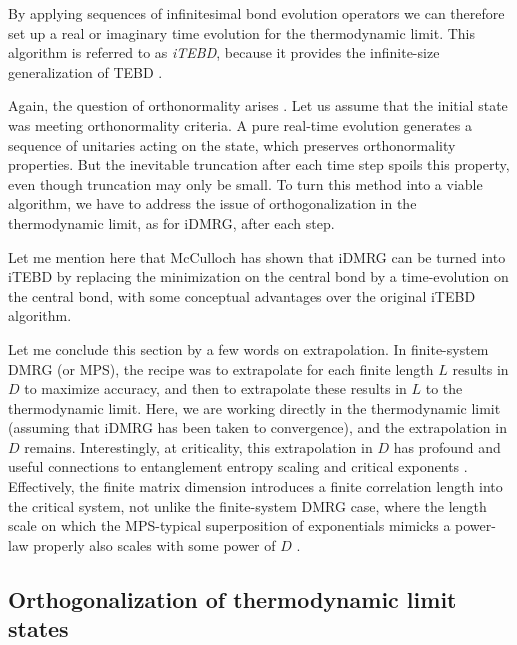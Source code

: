 \documentclass[a4paper,10pt,oneside,onecolumn,1p,times]{elsarticle}
\begin{document}
By applying sequences of infinitesimal bond evolution operators we can therefore set up a real or imaginary time evolution for the thermodynamic limit. This algorithm is referred to as {\em iTEBD}, because it provides the infinite-size generalization of TEBD \cite{Vidal07}.

Again, the question of orthonormality arises \cite{Orus08}. Let us assume that the initial state was meeting orthonormality criteria. A pure real-time evolution generates a sequence of unitaries acting on the state, which preserves orthonormality properties. But the inevitable truncation after each time step spoils this property, even though truncation may only be small. To turn this method into a viable algorithm, we have to address the issue of orthogonalization in the thermodynamic limit, as for iDMRG, after each step.

Let me mention here that McCulloch\cite{McCulloch08} has shown that iDMRG can be turned into iTEBD  by replacing the minimization on the central bond by a time-evolution on the central bond, with some conceptual advantages over the original iTEBD algorithm.

Let me conclude this section by a few words on extrapolation. In finite-system DMRG (or MPS), the recipe was to extrapolate for each finite length $L$ results in $D$ to maximize accuracy, and then to extrapolate these results in $L$ to the thermodynamic limit. Here, we are working directly in the thermodynamic limit (assuming that iDMRG has been taken to convergence), and the extrapolation in $D$ remains. Interestingly, at criticality, this extrapolation in $D$ has profound and useful connections to entanglement entropy scaling and critical exponents \cite{Tagliacozzo08}. Effectively, the finite matrix dimension introduces a finite correlation length into the critical system, not unlike the finite-system DMRG case, where the length scale on which the MPS-typical superposition of exponentials mimicks a power-law properly also scales with some power of $D$ \cite{Andersson99}.

\subsection{Orthogonalization of thermodynamic limit states}
\end{document}
